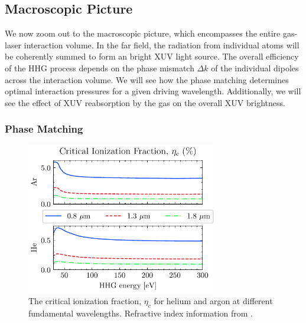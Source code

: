 \subsection{Macroscopic Picture}

We now zoom out to the macroscopic picture, which encompasses the entire gas-laser interaction volume. In the far field, the radiation from individual atoms will be coherently summed to form an bright XUV light source. The overall efficiency of the HHG process depends on the phase mismatch $\Delta k$ of the individual dipoles across the interaction volume. We will see how the phase matching determines optimal interaction pressures for a given driving wavelength. Additionally, we will see the effect of XUV reabsorption by the gas on the overall XUV brightness.

\subsubsection{Phase Matching}

\begin{figure}
	\centering
	\includegraphics[width=0.75\textwidth]{figures/chap1/crit_ion_frac.pdf}
	\caption{The critical ionization fraction, $\eta_c$ for helium and argon at different fundamental wavelengths. Refractive index information from \cite{gulliksonCXROXRayInteractions,peckDispersionArgon1964,mansfieldDispersionHelium1969}.}
	\label{fig:crit_ion_frac}
\end{figure}

